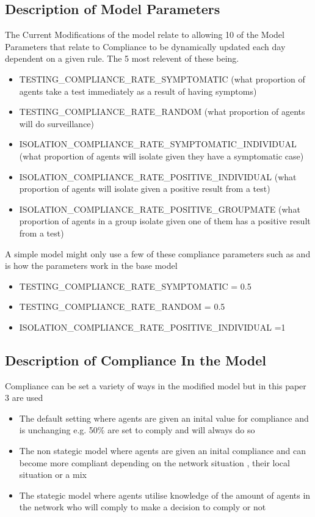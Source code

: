 \documentclass{article}
\begin{document}
\subsection{Description of Model Parameters}
The Current Modifications of the model relate to allowing 10 of the Model Parameters that relate to Compliance to be dynamically updated each day dependent on a given rule. The 5 most relevent of these being.
\begin{itemize}
\item TESTING\_COMPLIANCE\_RATE\_SYMPTOMATIC (what proportion of agents take a test immediately as a result of having symptoms)
\item TESTING\_COMPLIANCE\_RATE\_RANDOM  (what proportion of agents will do surveillance)
\item ISOLATION\_COMPLIANCE\_RATE\_SYMPTOMATIC\_INDIVIDUAL (what proportion of agents will isolate given they have a symptomatic case)
\item ISOLATION\_COMPLIANCE\_RATE\_POSITIVE\_INDIVIDUAL (what proportion of agents will isolate given a positive result from a test)
\item ISOLATION\_COMPLIANCE\_RATE\_POSITIVE\_GROUPMATE (what proportion of agents in a group isolate given one of them has a positive result from a test)
\end{itemize}

A simple model might only use a few of these compliance parameters such as  and is how the parameters work in the base model
\begin{itemize}
\item TESTING\_COMPLIANCE\_RATE\_SYMPTOMATIC = 0.5\
\item TESTING\_COMPLIANCE\_RATE\_RANDOM = 0.5
\item ISOLATION\_COMPLIANCE\_RATE\_POSITIVE\_INDIVIDUAL =1
\end{itemize}


\subsection{Description of Compliance In the Model}
Compliance can be set a variety of ways in the modified model but in this paper 3 are used
\begin{itemize}
\item The default setting where agents are given an inital value for compliance and is unchanging e.g. 50\% are set to comply and will always do so
\item The non stategic model where agents are given an inital compliance and can become more compliant depending on the network situation , their local situation or a mix
\item The stategic model where agents utilise knowledge of the amount of agents in the network who will comply to make a decision to comply or not
\end{itemize}
\end{document}
